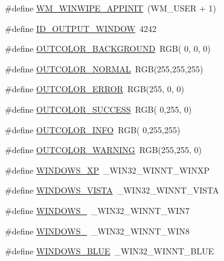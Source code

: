 \begin{DoxyCompactItemize}
\item 
\#define \hyperlink{app_8h_a9a71ce23c815392fc662b65767c37cf2}{W\-M\-\_\-\-W\-I\-N\-W\-I\-P\-E\-\_\-\-A\-P\-P\-I\-N\-I\-T}~(W\-M\-\_\-\-U\-S\-E\-R + 1)
\item 
\#define \hyperlink{app_8h_afde94533df99e3f82043b1f8030c7785}{I\-D\-\_\-\-O\-U\-T\-P\-U\-T\-\_\-\-W\-I\-N\-D\-O\-W}~4242
\item 
\#define \hyperlink{app_8h_a21becbf09a62fc591312279ef298b95e}{O\-U\-T\-C\-O\-L\-O\-R\-\_\-\-B\-A\-C\-K\-G\-R\-O\-U\-N\-D}~R\-G\-B(  0,  0,  0)
\item 
\#define \hyperlink{app_8h_a40e60352eb0f3cc3d18ab76509fc5d9d}{O\-U\-T\-C\-O\-L\-O\-R\-\_\-\-N\-O\-R\-M\-A\-L}~R\-G\-B(255,255,255)
\item 
\#define \hyperlink{app_8h_a625f9f9a3dfaf97497a05989e4eeb155}{O\-U\-T\-C\-O\-L\-O\-R\-\_\-\-E\-R\-R\-O\-R}~R\-G\-B(255,  0,  0)
\item 
\#define \hyperlink{app_8h_a597cccd07493d0c8d75029a3684c1150}{O\-U\-T\-C\-O\-L\-O\-R\-\_\-\-S\-U\-C\-C\-E\-S\-S}~R\-G\-B(  0,255,  0)
\item 
\#define \hyperlink{app_8h_a254f94b8bf44bed5d099696e513073a5}{O\-U\-T\-C\-O\-L\-O\-R\-\_\-\-I\-N\-F\-O}~R\-G\-B(  0,255,255)
\item 
\#define \hyperlink{app_8h_a4d01656d06379bbcf57b9ec415fced45}{O\-U\-T\-C\-O\-L\-O\-R\-\_\-\-W\-A\-R\-N\-I\-N\-G}~R\-G\-B(255,255,  0)
\item 
\#define \hyperlink{app_8h_a120fea815d6c695bab2c5c8fd691a31b}{W\-I\-N\-D\-O\-W\-S\-\_\-\-X\-P}~\-\_\-\-W\-I\-N32\-\_\-\-W\-I\-N\-N\-T\-\_\-\-W\-I\-N\-X\-P
\item 
\#define \hyperlink{app_8h_a852804c56e4e7e31111fbee71a209656}{W\-I\-N\-D\-O\-W\-S\-\_\-\-V\-I\-S\-T\-A}~\-\_\-\-W\-I\-N32\-\_\-\-W\-I\-N\-N\-T\-\_\-\-V\-I\-S\-T\-A
\item 
\#define \hyperlink{app_8h_a51504726b7304059d5ffdb2e0284c90b}{W\-I\-N\-D\-O\-W\-S\-\_}~\-\_\-\-W\-I\-N32\-\_\-\-W\-I\-N\-N\-T\-\_\-\-W\-I\-N7
\item 
\#define \hyperlink{app_8h_a98e0d1150640e23a502e70c0e4c1d0c1}{W\-I\-N\-D\-O\-W\-S\-\_}~\-\_\-\-W\-I\-N32\-\_\-\-W\-I\-N\-N\-T\-\_\-\-W\-I\-N8
\item 
\#define \hyperlink{app_8h_a8d9dead09caf7611026ddf7581773239}{W\-I\-N\-D\-O\-W\-S\-\_\-\-B\-L\-U\-E}~\-\_\-\-W\-I\-N32\-\_\-\-W\-I\-N\-N\-T\-\_\-\-B\-L\-U\-E
\end{DoxyCompactItemize}
